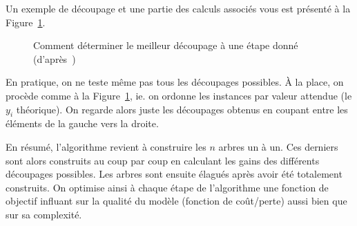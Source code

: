 Un exemple de découpage et une partie des calculs associés vous est présenté à la Figure~\ref{fig:pruning}.

\begin{figure}[h]
	\begin{margincap}
	  \centering
	  
	  \caption{Comment déterminer le meilleur découpage à une étape donné (d'après~\cite{bib:xgboost_paper})}
	  \label{fig:pruning}
	\end{margincap}
\end{figure}

En pratique, on ne teste même pas tous les découpages possibles. À la place, on procède comme à la Figure~\ref{fig:pruning}, ie. on ordonne les instances par valeur attendue (le $y_i$ théorique). On regarde alors juste les découpages obtenus en coupant entre les éléments de la gauche vers la droite.

En résumé, l'algorithme revient à construire les $n$ arbres un à un. Ces derniers sont alors construits au coup par coup en calculant les gains des différents découpages possibles. Les arbres sont ensuite élagués après avoir été totalement construits. On optimise ainsi à chaque étape de l'algorithme une fonction de objectif influant sur la qualité du modèle (fonction de coût/perte) aussi bien que sur sa complexité.